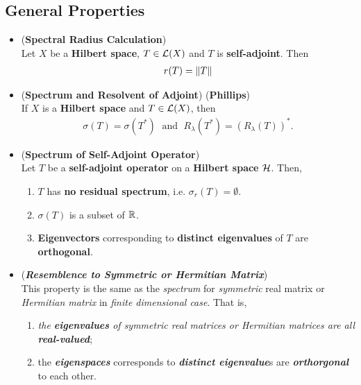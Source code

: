 \documentclass[11pt]{article}
\begin{document}
\subsection{General Properties}
\begin{itemize}
\item \begin{proposition} (\textbf{Spectral Radius Calculation}) \citep{reed1980methods}\\
Let $X$ be a  \textbf{Hilbert space}, $T \in {\mathcal L}(X)$ and $T$ is \textbf{self-adjoint}. Then 
\begin{align*}
r(T) = \left\|T\right\|_{}
\end{align*}
\end{proposition}

\item \begin{theorem} (\textbf{Spectrum and Resolvent of Adjoint}) (\textbf{Phillips}) \citep{reed1980methods}\\ 
If $X$ is a \textbf{Hilbert space} and $T \in {\mathcal L}(X)$, then 
\begin{align*}
\sigma(T) = \sigma(T^{*})\; \text{ and }\; R_{\lambda}(T^{*}) = (R_{\lambda}(T))^{*}.
\end{align*}
\end{theorem}

\item \begin{proposition}  (\textbf{Spectrum of Self-Adjoint Operator}) \citep{reed1980methods}\\ 
Let $Τ$ be a \textbf{self-adjoint operator} on a \textbf{Hilbert space} ${\mathcal H}$. Then, 
\begin{enumerate}
\item $T$ has \textbf{no residual spectrum}, i.e. $\sigma_{r}(T) = \emptyset$. 
\item $\sigma(T)$ is a subset of ${\mathbb R}$. 
\item \textbf{Eigenvectors} corresponding to \textbf{distinct eigenvalues} of $T$ are \textbf{orthogonal}. 
\end{enumerate}
\end{proposition}

\item \begin{remark} (\emph{\textbf{Resemblence to Symmetric or Hermitian Matrix}})\\
This property is the same as the \emph{spectrum} for \emph{symmetric} real matrix or \emph{Hermitian matrix} in \emph{finite dimensional case}. That is, 
\begin{enumerate}
\item \emph{the \textbf{eigenvalues} of \emph{symmetric real matrices} or \emph{Hermitian matrices} are all \textbf{real-valued}}; 
\item the \emph{\textbf{eigenspaces}} corresponds to \emph{\textbf{distinct eigenvalue}}s are \emph{\textbf{orthorgonal}} to each other.
\end{enumerate} 
\end{remark}

\end{itemize}
\end{document}
